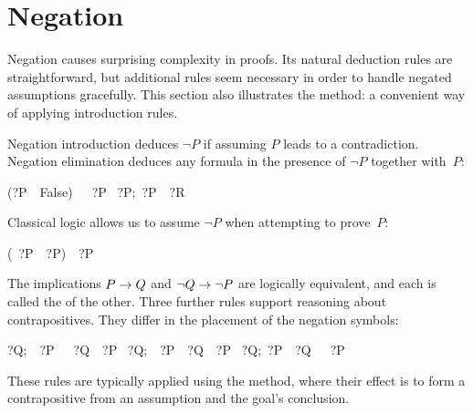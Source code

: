 \section{Negation}
 
%
Negation causes surprising complexity in proofs.  Its natural 
deduction rules are straightforward, but additional rules seem 
necessary in order to handle negated assumptions gracefully.  This section
also illustrates the  method: a convenient way of
applying introduction rules.

Negation introduction deduces $\neg P$ if assuming $P$ leads to a 
contradiction. Negation elimination deduces any formula in the 
presence of $\neg P$ together with~$P$: 
\begin{isabelle}
(?P\ \isasymLongrightarrow\ False)\ \isasymLongrightarrow\ \isasymnot\ ?P%
\isanewline
\isasymlbrakk{\isasymnot}\ ?P;\ ?P\isasymrbrakk\ \isasymLongrightarrow\ ?R%
\end{isabelle}
%
Classical logic allows us to assume $\neg P$ 
when attempting to prove~$P$: 
\begin{isabelle}
(\isasymnot\ ?P\ \isasymLongrightarrow\ ?P)\ \isasymLongrightarrow\ ?P%
\end{isabelle}

The implications $P\rightarrow Q$ and $\neg Q\rightarrow\neg P$ are logically
equivalent, and each is called the
 of the other.  Three further rules support
reasoning about contrapositives.  They differ in the placement of the
negation symbols: 
\begin{isabelle}
\isasymlbrakk?Q;\ \isasymnot\ ?P\ \isasymLongrightarrow\ \isasymnot\ ?Q\isasymrbrakk\ \isasymLongrightarrow\ ?P%
\isanewline
\isasymlbrakk{\isasymnot}\ ?Q;\ \isasymnot\ ?P\ \isasymLongrightarrow\ ?Q\isasymrbrakk\ \isasymLongrightarrow\ ?P%
\isanewline
\isasymlbrakk{\isasymnot}\ ?Q;\ ?P\ \isasymLongrightarrow\ ?Q\isasymrbrakk\ \isasymLongrightarrow\ \isasymnot\ ?P%
\end{isabelle}
%
These rules are typically applied using the  method, where 
their effect is to form a contrapositive from an 
assumption and the goal's conclusion.  

